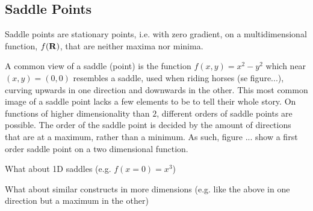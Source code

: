 \subsection{Saddle Points}
\label{sec:sps}

Saddle points are stationary points, i.e. with zero gradient, on a multidimensional function, $f({\mathrm{\mathbf{\bm{R}}}})$, that are neither maxima nor minima.

A common view of a saddle (point) is the function $f(x, y) = x^2 - y^2$ which near $(x,y) = (0,0)$ resembles a saddle, used when riding horses (se figure...), curving upwards in one direction and downwards in the other.
This most common image of a saddle point lacks a few elements to be to tell their whole story.
On functions of higher dimensionality than $2$, different orders of saddle points are possible.
The order of the saddle point is decided by the amount of directions that are at a maximum, rather than a minimum.
As such, figure ... show a first order saddle point on a two dimensional function.

\bit
\item What about 1D saddles (e.g. $f(x = 0) = x^3$)
\item What about similar constructs in more dimensions (e.g. like the above in one direction but a maximum in the other)
\eit

\recent

\incomplete
